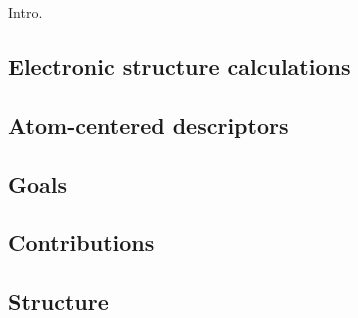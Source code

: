 Intro.

\subsection{Electronic structure calculations}

\subsection{Atom-centered descriptors}

\subsection{Goals}

\subsection{Contributions}

\subsection{Structure}
